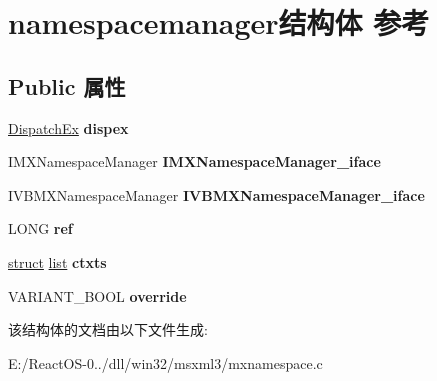 \hypertarget{structnamespacemanager}{}\section{namespacemanager结构体 参考}
\label{structnamespacemanager}
\subsection*{Public 属性}
\begin{DoxyCompactItemize}
\item 
\mbox{\label{structnamespacemanager_a2752fcafe43aa50a9f2b65de55a16454}} 
\hyperlink{struct_dispatch_ex}{Dispatch\+Ex} {\bfseries dispex}
\item 
\mbox{\label{structnamespacemanager_a7389941c0f69113bdccfc96be103210b}} 
I\+M\+X\+Namespace\+Manager {\bfseries I\+M\+X\+Namespace\+Manager\+\_\+iface}
\item 
\mbox{\label{structnamespacemanager_a8468e7b7015416ee159ea0a5bba85e19}} 
I\+V\+B\+M\+X\+Namespace\+Manager {\bfseries I\+V\+B\+M\+X\+Namespace\+Manager\+\_\+iface}
\item 
\mbox{\label{structnamespacemanager_a8f8f72dd5130873ccbb6be5405d371f4}} 
L\+O\+NG {\bfseries ref}
\item 
\mbox{\label{structnamespacemanager_ad44d488ae8b7c4bfe0ebee9a7f4255e2}} 
\hyperlink{interfacestruct}{struct} \hyperlink{classlist}{list} {\bfseries ctxts}
\item 
\mbox{\label{structnamespacemanager_a566f2b1c174638fd6f7ed2f36450c946}} 
V\+A\+R\+I\+A\+N\+T\+\_\+\+B\+O\+OL {\bfseries override}
\end{DoxyCompactItemize}


该结构体的文档由以下文件生成\+:\begin{DoxyCompactItemize}
\item 
E\+:/\+React\+O\+S-\/0../dll/win32/msxml3/mxnamespace.\+c\end{DoxyCompactItemize}

